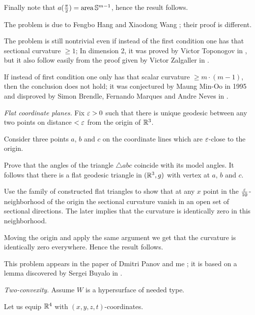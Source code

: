 Finally note that $a(\tfrac\pi2)=\operatorname{\rm area}\mathbb{S}^{m-1}$,
hence the result follows.
 

The problem is due to Fengbo Hang %
and Xiaodong Wang %
\cite{hang-wang};
their proof is different.

The problem is still nontrivial 
even if instead of the first condition one has that sectional curvature $\ge 1$;
In dimension 2, 
it was proved by Victor Toponogov in \cite{toponogov},
but it also follow easily from the proof given by Victor Zalgaller in \cite{zalgaller-shperical-polygon}.


If instead of first condition one only has that scalar curvature $\ge m\cdot(m-1)$, then the conclusion does not hold; 
it was conjectured by Maung Min-Oo in 1995 
and disproved by
Simon Brendle,
Fernando Marques
and Andre Neves in \cite{brendle-marques-neve}.



\textit{Flat coordinate planes.}
Fix $\varepsilon>0$ such that there is unique geodesic between any two points on distance $<\varepsilon$ from the origin of $\mathbb{R}^3$.

Consider three points $a$, $b$ and $c$ 
on the coordinate lines which are $\varepsilon$-close 
to the origin.

Prove that the angles of the triangle $\triangle abc$
coincide with its model angles.
It follows that there is a flat geodesic triangle in $(\mathbb{R}^3,g)$ with vertex at $a$, $b$ and $c$.

Use the family of constructed flat triangles 
to show that at any $x$ point in the $\tfrac{\varepsilon}{10}$-neighborhood of the origin
the sectional curvature 
vanish in an open set of sectional directions.
The later implies that the curvature is identically zero 
in this neighborhood.

Moving the origin and apply the same argument we get that the curvature is identically zero everywhere.
Hence the result follows. 

This problem appears in the paper of Dmitri Panov and me \cite{panov-petrunin}; 
it is based on a lemma discovered by Sergei Buyalo in \cite{buyalo}.

\textit{Two-convexity.}
Assume $W$ is a hypersurface of needed type.

Let us equip $\mathbb{R}^4$ with $(x,y,z,t)$-coordinates.

